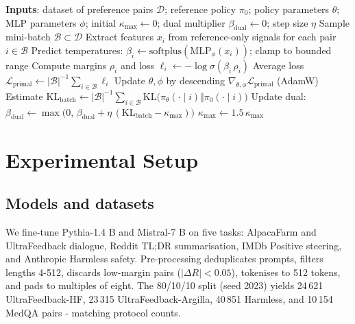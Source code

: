 \documentclass{article}
\begin{document}
\begin{algorithm}[h]
\caption{C3PO training loop}
\begin{algorithmic}
  \State \textbf{Inputs}: dataset of preference pairs \(\mathcal{D}\); reference policy \(\pi_{0}\); policy parameters \(\theta\); MLP parameters \(\phi\); initial \(\kappa_{\max} \leftarrow 0\); dual multiplier \(\beta_{\text{dual}} \leftarrow 0\); step size \(\eta\)
    \State Sample mini-batch \(\mathcal{B} \subset \mathcal{D}\)
    \State Extract features \(x_i\) from reference-only signals for each pair \(i \in \mathcal{B}\)
    \State Predict temperatures: \(\beta_i \leftarrow \mathrm{softplus}(\mathrm{MLP}_{\phi}(x_i))\); clamp to bounded range
    \State Compute margins \(\rho_i\) and loss \(\ell_i \leftarrow -\log \sigma(\beta_i\,\rho_i)\)
    \State Average loss \(\mathcal{L}_{\text{primal}} \leftarrow |\mathcal{B}|^{-1} \sum_{i\in\mathcal{B}} \ell_i\)
    \State Update \(\theta, \phi\) by descending \(\nabla_{\theta,\phi} \mathcal{L}_{\text{primal}}\) (AdamW)
    \State Estimate \(\mathrm{KL}_{\text{batch}} \leftarrow |\mathcal{B}|^{-1} \sum_{i\in\mathcal{B}} \mathrm{KL}\bigl(\pi_{\theta}(\cdot\mid i)\Vert\pi_{0}(\cdot\mid i)\bigr)\)
    \State Update dual: \(\beta_{\text{dual}} \leftarrow \max\bigl(0,\, \beta_{\text{dual}} + \eta\,(\mathrm{KL}_{\text{batch}} - \kappa_{\max})\bigr)\)
        \State \(\kappa_{\max} \leftarrow 1.5\,\kappa_{\max}\)
      \EndIf
    \EndIf
  \EndFor
\end{algorithmic}
\end{algorithm}

\section{Experimental Setup}
\subsection{Models and datasets}
We fine-tune Pythia-1.4 B and Mistral-7 B on five tasks: AlpacaFarm and UltraFeedback dialogue, Reddit TL;DR summarisation, IMDb Positive steering, and Anthropic Harmless safety. Pre-processing deduplicates prompts, filters lengths 4-512, discards low-margin pairs (\(|\Delta R| < 0.05\)), tokenises to 512 tokens, and pads to multiples of eight. The 80/10/10 split (seed 2023) yields 24\,621 UltraFeedback-HF, 23\,315 UltraFeedback-Argilla, 40\,851 Harmless, and 10\,154 MedQA pairs - matching protocol counts.
\end{document}
